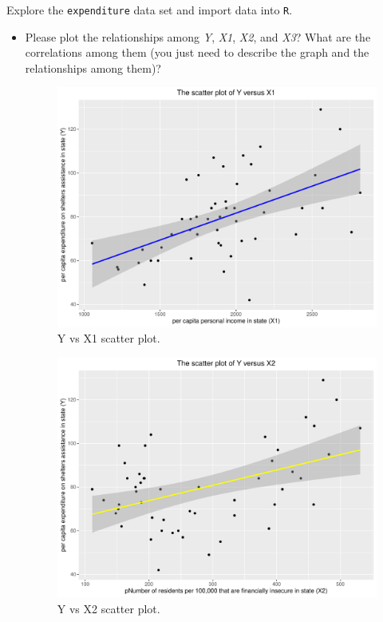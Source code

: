 \documentclass[12pt,letterpaper]{article}
\begin{document}
\vspace{.5cm}
\noindent Explore the \texttt{expenditure} data set and import data into \texttt{R}.
\vspace{.5cm}
  
\vspace{.5cm}
\begin{itemize}

\item
Please plot the relationships among \emph{Y}, \emph{X1}, \emph{X2}, and \emph{X3}? What are the correlations among them (you just need to describe the graph and the relationships among them)?
\vspace{0.5cm}

\begin{figure}[h!]\centering
	\caption{\footnotesize Y vs X1 scatter plot.}
	\label{fig:plot_Y_vs_X1}
	\includegraphics[width=.75\textwidth]{Y_vs_X1_scatterplot.pdf}
\end{figure}
\begin{figure}[h!]\centering
	\caption{\footnotesize Y vs X2 scatter plot.}
	\label{fig:plot_Y_vs_X2}
	\includegraphics[width=.75\textwidth]{Y_vs_X2_scatterplot.pdf}

\end{figure}
\end{itemize}
\end{document}
